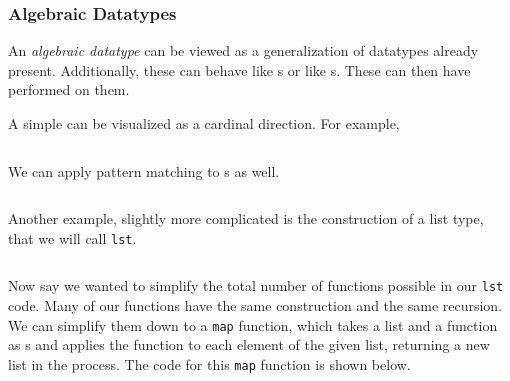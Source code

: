 \subsubsection{Algebraic Datatypes}\label{subsubsec:Functional-SML-Algebraic_Datatypes}
\begin{definition}\label{def:Algebraic_Datatype}
  An \emph{algebraic datatype} can be viewed as a generalization of datatypes already present.
  Additionally, these can behave like s or like s.
  These can then have  performed on them.
\end{definition}

A simple  can be visualized as a cardinal direction.
For example,
\inputminted[frame=lines,linenos]{sml}{./EDAP05-Concepts_Programming_Languages-Sections/Functional_Programming/Code/Algebraic_Datatype-Direction.sml}

We can apply pattern matching to s as well.
\inputminted[frame=lines,linenos]{sml}{./EDAP05-Concepts_Programming_Languages-Sections/Functional_Programming/Code/Algebraic_Datatype-Direction-Pattern_Match.sml}

Another example, slightly more complicated is the construction of a list type, that we will call \texttt{lst}.
\inputminted[frame=lines,linenos]{sml}{./EDAP05-Concepts_Programming_Languages-Sections/Functional_Programming/Code/Algebraic_Datatype-lst.sml}

Now say we wanted to simplify the total number of functions possible in our \texttt{lst} code.
Many of our functions have the same construction and the same recursion.
We can simplify them down to a \texttt{map} function, which takes a list and a function as s and applies the function to each element of the given list, returning a new list in the process.
The code for this \texttt{map} function is shown below.
\inputminted[frame=lines,linenos]{sml}{./EDAP05-Concepts_Programming_Languages-Sections/Functional_Programming/Code/lst-map.sml}

